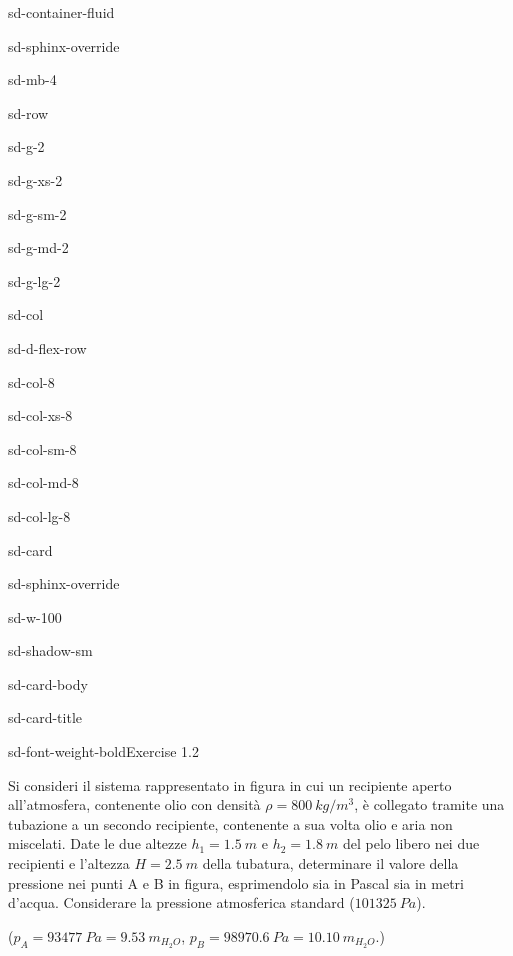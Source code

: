\documentclass[letterpaper,10pt,italian]{jupyterBook}
\begin{document}
\begin{sphinxuseclass}{sd-container-fluid}
\begin{sphinxuseclass}{sd-sphinx-override}
\begin{sphinxuseclass}{sd-mb-4}
\begin{sphinxuseclass}{sd-row}
\begin{sphinxuseclass}{sd-g-2}
\begin{sphinxuseclass}{sd-g-xs-2}
\begin{sphinxuseclass}{sd-g-sm-2}
\begin{sphinxuseclass}{sd-g-md-2}
\begin{sphinxuseclass}{sd-g-lg-2}
\begin{sphinxuseclass}{sd-col}
\begin{sphinxuseclass}{sd-d-flex-row}
\begin{sphinxuseclass}{sd-col-8}
\begin{sphinxuseclass}{sd-col-xs-8}
\begin{sphinxuseclass}{sd-col-sm-8}
\begin{sphinxuseclass}{sd-col-md-8}
\begin{sphinxuseclass}{sd-col-lg-8}
\begin{sphinxuseclass}{sd-card}
\begin{sphinxuseclass}{sd-sphinx-override}
\begin{sphinxuseclass}{sd-w-100}
\begin{sphinxuseclass}{sd-shadow-sm}
\begin{sphinxuseclass}{sd-card-body}
\begin{sphinxuseclass}{sd-card-title}
\begin{sphinxuseclass}{sd-font-weight-bold}Exercise 1.2
\end{sphinxuseclass}
\end{sphinxuseclass}
\sphinxAtStartPar
Si consideri il sistema rappresentato in figura in cui un recipiente
aperto all’atmosfera, contenente olio con densità \(\rho= 800\ kg/m^3\), è
collegato tramite una tubazione a un secondo recipiente, contenente a
sua volta olio e aria non miscelati. Date le due altezze \(h_1=1.5\ m\) e \(h_2= 1.8 \ m\)
del pelo libero nei due recipienti e l’altezza \(H= 2.5\ m\) della tubatura,
determinare il valore della pressione nei punti A e B in figura,
esprimendolo sia in Pascal sia in metri d’acqua. Considerare la
pressione atmosferica standard (\(101325\ Pa\)).

\sphinxAtStartPar
(\(p_A=93477\ Pa = 9.53\ m_{H_2O}\), \(p_B=98970.6\ Pa=10.10\ m_{H_2O}\).)


\end{sphinxuseclass}
\end{sphinxuseclass}
\end{sphinxuseclass}
\end{sphinxuseclass}
\end{sphinxuseclass}
\end{sphinxuseclass}
\end{sphinxuseclass}
\end{sphinxuseclass}
\end{sphinxuseclass}
\end{sphinxuseclass}
\end{sphinxuseclass}
\end{sphinxuseclass}
\end{sphinxuseclass}
\end{sphinxuseclass}
\end{sphinxuseclass}
\end{sphinxuseclass}
\end{sphinxuseclass}
\end{sphinxuseclass}
\end{sphinxuseclass}
\end{sphinxuseclass}
\end{sphinxuseclass}
\end{document}
